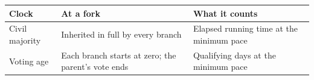 
\begingroup\small\renewcommand{\arraystretch}{1.12}
\begin{longtable}{@{}>{\raggedright\arraybackslash}p{}>{\raggedright\arraybackslash}p{}>{\raggedright\arraybackslash}p{}@{}}
\hline
\textbf{Clock} & \textbf{At a fork} & \textbf{What it counts} \\
\hline
\endhead
Civil majority & Inherited in full by every branch & Elapsed running time at the minimum pace \\ \hline
Voting age & Each branch starts at zero; the parent's vote ends & Qualifying days at the minimum pace \\ \hline
\end{longtable}
\endgroup

